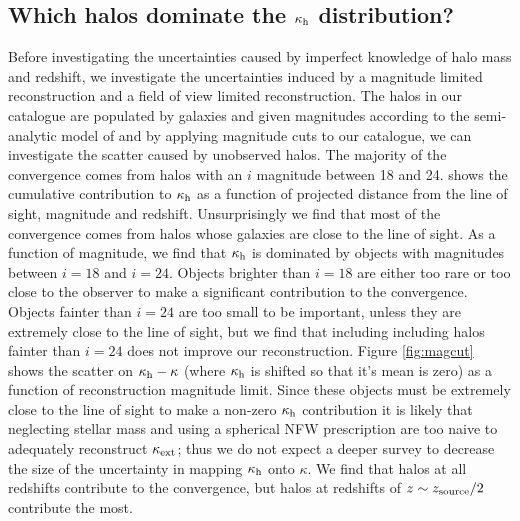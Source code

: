 \documentclass[useAMS,usenatbib]{mn2e}
\begin{document}

\subsection{Which halos dominate the $\kappa_{\rm h}$ distribution?}

Before investigating the uncertainties caused by imperfect knowledge of
halo mass and redshift, we investigate the uncertainties induced by a
magnitude limited reconstruction and a field of view limited
reconstruction. The halos in our catalogue are populated by galaxies and
given magnitudes according to the semi-analytic model of
\citet{DeLucia+Blaizot2007} and by applying magnitude cuts to our
catalogue, we can investigate the scatter caused by unobserved halos.
The majority of the convergence comes from halos with an $i$ magnitude
between 18 and 24.  shows the cumulative
contribution to $\kappa_{\rm h}$ as a function of projected distance from the
line of sight, magnitude and redshift. Unsurprisingly we find that most
of the convergence comes from halos whose galaxies are close to the line
of sight. As a function of magnitude, we find that $\kappa_{\rm h}$ is
dominated by objects with magnitudes between $i=18$ and $i=24$. Objects
brighter than $i=18$ are either too rare or too close to the observer to
make a significant contribution to the convergence. Objects fainter than
$i=24$ are too small to be important, unless they are extremely close to
the line of sight, but we find that including including halos fainter
than $i=24$ does not improve our reconstruction. Figure \ref{fig:magcut}
shows the scatter on $\kappa_{\rm h}-\kappa$ (where $\kappa_{\rm h}$ is shifted so
that it's mean is zero) as a function of reconstruction magnitude limit.
Since these objects must be extremely close to the line of sight to make
a non-zero $\kappa_{\rm h}$ contribution it is likely that neglecting stellar
mass and using a spherical NFW prescription are too naive to adequately
reconstruct $\kappa_{\rm ext}$; thus we do not expect a deeper survey to decrease
the size of the uncertainty in mapping $\kappa_{\rm h}$ onto $\kappa$. We find
that halos at all redshifts contribute to the convergence, but halos at
redshifts of $z \sim z_{\rm source}/2$ contribute the most.  
\end{document}
